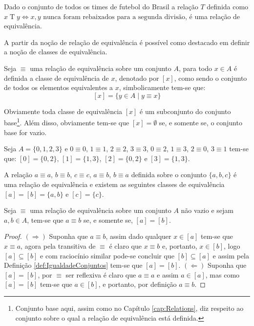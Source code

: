 \begin{exemplo}
	Dado o conjunto de todos os times de futebol do Brasil a relação $T$ definida como $x \mathrel{T} y \Longleftrightarrow x, y \text{ nunca foram rebaixados para a segunda divisão}$, é uma relação de equivalência.
\end{exemplo}

A partir da noção de relação de equivalência é possível como destacado em \cite{abe1991-TC} definir a noção de classes de equivalência.

\begin{definicao}\label{def:ClasseEquivalencia}
	Seja $\equiv$ uma relação de equivalência sobre um conjunto $A$, para todo $x \in A$ é definida a classe de equivalência de $x$, denotado por $[x]$, como sendo o conjunto de todos os elementos equivalentes a $x$, simbolicamente tem-se que:
	$$[x] = \{y \in A \mid y \equiv x\}$$
\end{definicao}

Obviamente toda classe de equivalência $[x]$ é um subconjunto do conjunto base\footnote{Conjunto base aqui, assim como no Capítulo \ref{cap:Relations}, diz respeito ao conjunto sobre o qual a relação de equivalência está definida.}. Além disso,  obviamente tem-se que $[x] = \emptyset$ se, e somente se, o conjunto base for vazio.

\begin{exemplo}\label{exe:ClasseEquivalencia1}
	Seja $A = \{0, 1, 2, 3\}$ e $0 \equiv 0$, $1 \equiv 1$, $2 \equiv 2$, $3 \equiv 3$, $0 \equiv 2$, $1 \equiv 3$, $2 \equiv 0$, $3 \equiv 1$ tem-se que: $[0] = \{0, 2\}$, $[1] = \{1, 3\}$, $[2] = \{0, 2\}$ e $[3] = \{1, 3\}$.
\end{exemplo}

\begin{exemplo}
	A relação $a \equiv a$, $b \equiv b$, $c \equiv c$, $a \equiv b$, $b \equiv a$ definida sobre o conjunto $\{a, b, c\}$ é uma relação de equivalência e existem as seguintes classes de equivalência $[a] = [b] = \{a, b\}$ e $[c] =\{c\}$.
\end{exemplo}

\begin{teorema}\label{teo:EquivalenciaPropriedade1}
	Seja $\equiv$ uma relação de equivalência sobre um conjunto $A$ não vazio e sejam $a, b \in A$, tem-se que $a \equiv b$ se, e somente se, $[a] = [b]$.
\end{teorema}

\begin{proof}
	$(\Rightarrow)$ Suponha que $a \equiv b$, assim dado  qualquer $x \in [a]$ tem-se que $x \equiv a$, agora pela transitiva de $\equiv$ é claro que $x \equiv b$ e, portanto, $x \in [b]$, logo $[a] \subseteq [b]$ e com raciocínio similar pode-se concluir que $[b] \subseteq [a]$ e assim pela Definição \ref{def:IgualdadeConjuntos} tem-se que $[a] = [b]$. $(\Leftarrow)$ Suponha que $[a] = [b]$, por $\equiv$ ser reflexiva é claro que $a \equiv a$ e assim $a \in [a]$, mas como $[a] = [b]$ tem-se que $a \in [b]$, e portanto, por definição $a \equiv b$.
\end{proof}


